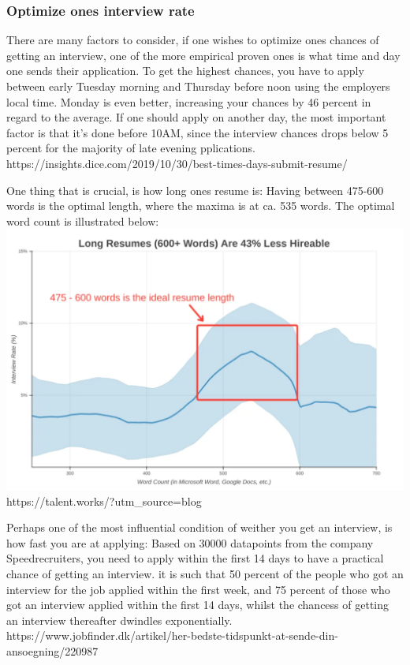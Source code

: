 \subsubsection{Optimize ones interview rate}
There are many factors to consider, if one wishes to optimize ones
chances of getting an interview, one of the more empirical proven ones
is what time and day one sends their application.
To get the highest chances, you have to apply between early Tuesday morning
and Thursday before noon using the employers local time. Monday is even better,
increasing your chances by 46 percent in regard to the average.
If one should apply on another day, the most important factor is that
it's done before 10AM, since the interview chances drops below 5 percent for
the majority of late evening pplications.
https://insights.dice.com/2019/10/30/best-times-days-submit-resume/

One thing that is crucial, is how long ones resume is:
Having between 475-600 words is the optimal length, where the maxima is at
ca. 535 words. The optimal word count is illustrated below:
\includegraphics{figures/longresumegraph.png}
https://talent.works/?utm_source=blog


Perhaps one of the most influential condition of weither you get an interview,
is how fast you are at applying:
Based on 30000 datapoints from the company Speedrecruiters, you need
to apply within the first 14 days to have a practical chance of getting an
interview. it is such that 50 percent of the people who got an interview
for the job applied within the first week, and 75 percent of those who
got an interview applied within the first 14 days, whilst the chancess of
getting an interview thereafter dwindles exponentially.
https://www.jobfinder.dk/artikel/her-bedste-tidspunkt-at-sende-din-ansoegning/220987

